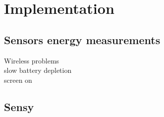 \section{Implementation}
\label{s:implementation}
\subsection{Sensors energy measurements}
Wireless problems\\
slow battery depletion\\
	screen on\\
\subsection{Sensy}